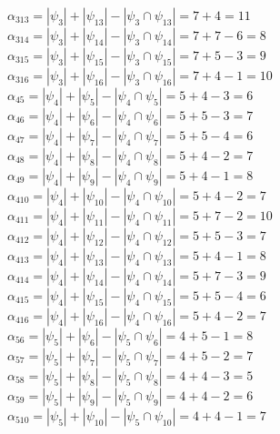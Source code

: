 \documentclass[12pt,a4paper]{report}
\begin{document}
$\alpha_{313} = |\psi_{3}| + |\psi_{13}| - |\psi_{3} \cap \psi_{13}| = 7 + 4 = 11$ \\
$\alpha_{314} = |\psi_{3}| + |\psi_{14}| - |\psi_{3} \cap \psi_{14}| = 7 + 7 - 6 = 8$ \\
$\alpha_{315} = |\psi_{3}| + |\psi_{15}| - |\psi_{3} \cap \psi_{15}| = 7 + 5 - 3 = 9$ \\
$\alpha_{316} = |\psi_{3}| + |\psi_{16}| - |\psi_{3} \cap \psi_{16}| = 7 + 4 - 1 = 10$ \\
$\alpha_{45} = |\psi_{4}| + |\psi_{5}| - |\psi_{4} \cap \psi_{5}| = 5 + 4 - 3 = 6$ \\
$\alpha_{46} = |\psi_{4}| + |\psi_{6}| - |\psi_{4} \cap \psi_{6}| = 5 + 5 - 3 = 7$ \\
$\alpha_{47} = |\psi_{4}| + |\psi_{7}| - |\psi_{4} \cap \psi_{7}| = 5 + 5 - 4 = 6$ \\
$\alpha_{48} = |\psi_{4}| + |\psi_{8}| - |\psi_{4} \cap \psi_{8}| = 5 + 4 - 2 = 7$ \\
$\alpha_{49} = |\psi_{4}| + |\psi_{9}| - |\psi_{4} \cap \psi_{9}| = 5 + 4 - 1 = 8$ \\
$\alpha_{410} = |\psi_{4}| + |\psi_{10}| - |\psi_{4} \cap \psi_{10}| = 5 + 4 - 2 = 7$ \\
$\alpha_{411} = |\psi_{4}| + |\psi_{11}| - |\psi_{4} \cap \psi_{11}| = 5 + 7 - 2 = 10$ \\
$\alpha_{412} = |\psi_{4}| + |\psi_{12}| - |\psi_{4} \cap \psi_{12}| = 5 + 5 - 3 = 7$ \\
$\alpha_{413} = |\psi_{4}| + |\psi_{13}| - |\psi_{4} \cap \psi_{13}| = 5 + 4 - 1 = 8$ \\
$\alpha_{414} = |\psi_{4}| + |\psi_{14}| - |\psi_{4} \cap \psi_{14}| = 5 + 7 - 3 = 9$ \\
$\alpha_{415} = |\psi_{4}| + |\psi_{15}| - |\psi_{4} \cap \psi_{15}| = 5 + 5 - 4 = 6$ \\
$\alpha_{416} = |\psi_{4}| + |\psi_{16}| - |\psi_{4} \cap \psi_{16}| = 5 + 4 - 2 = 7$ \\
$\alpha_{56} = |\psi_{5}| + |\psi_{6}| - |\psi_{5} \cap \psi_{6}| = 4 + 5 - 1 = 8$ \\
$\alpha_{57} = |\psi_{5}| + |\psi_{7}| - |\psi_{5} \cap \psi_{7}| = 4 + 5 - 2 = 7$ \\
$\alpha_{58} = |\psi_{5}| + |\psi_{8}| - |\psi_{5} \cap \psi_{8}| = 4 + 4 - 3 = 5$ \\
$\alpha_{59} = |\psi_{5}| + |\psi_{9}| - |\psi_{5} \cap \psi_{9}| = 4 + 4 - 2 = 6$ \\
$\alpha_{510} = |\psi_{5}| + |\psi_{10}| - |\psi_{5} \cap \psi_{10}| = 4 + 4 - 1 = 7$ \\
\end{document}
